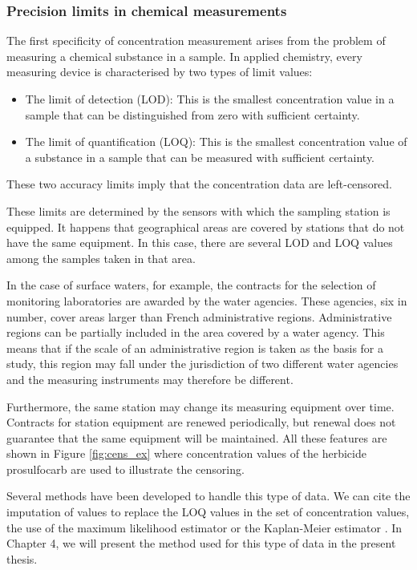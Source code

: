 \subsubsection{Precision limits in chemical measurements}

The first specificity of concentration measurement arises from the problem of measuring a chemical substance in a sample. In applied chemistry, every measuring device is characterised by two types of limit values: 
\begin{itemize}
    \item The limit of detection (LOD): This is the smallest concentration value in a sample that can be distinguished from zero with sufficient certainty.
    \item The limit of quantification (LOQ): This is the smallest concentration value of a substance in a sample that can be measured with  sufficient certainty. 
\end{itemize}
These two accuracy limits imply that the concentration data are left-censored. 

These limits are determined by the sensors with which the sampling station is equipped. It happens that geographical areas are covered by stations that do not have the same equipment. In this case, there are several LOD and LOQ values among the samples taken in that area. 

In the case of surface waters, for example, the contracts for the selection of monitoring laboratories are awarded by the water agencies. These agencies, six in number, cover areas larger than French administrative regions. Administrative regions can be partially included in the area covered by a water agency. This means that if the scale of an administrative region is taken as the basis for a study, this region may fall under the jurisdiction of two different water agencies and the measuring instruments may therefore be different. 

Furthermore, the same station may change its measuring equipment over time. Contracts for station equipment are renewed periodically, but renewal does not guarantee that the same equipment will be maintained. All these features are shown in Figure \ref{fig:cens_ex} where concentration values of the herbicide prosulfocarb are used to illustrate the censoring. 

Several methods have been developed to handle this type of data. We can cite the imputation of values to replace the LOQ values in the set of concentration values, the use of the maximum likelihood estimator or the Kaplan-Meier estimator \citep{Gillaizeau2020,Croghan2003MethodsOD}. In Chapter 4, we will present the method used for this type of data in the present thesis. 

